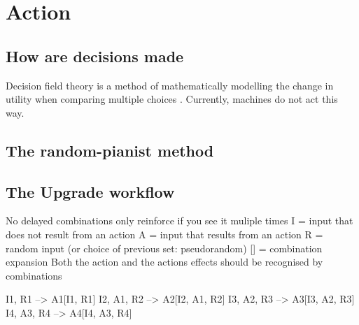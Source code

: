 \chapter{Action}
\section{How are decisions made}
Decision field theory is a method of mathematically modelling the change in utility when comparing multiple choices \cite{busemeyer2002survey}.
Currently, machines do not act this way.

\section{The random-pianist method}

\section{The Upgrade workflow}
No delayed combinations
only reinforce if you see it muliple times
I = input that does not result from an action
A = input that results from an action
R = random input (or choice of previous set: pseudorandom)
[] = combination expansion
Both the action and the actions effects should be recognised by combinations

I1, R1        -->    A1[I1, R1]
I2, A1, R2    -->    A2[I2, A1, R2]
I3, A2, R3    -->    A3[I3, A2, R3]
I4, A3, R4    -->    A4[I4, A3, R4]

